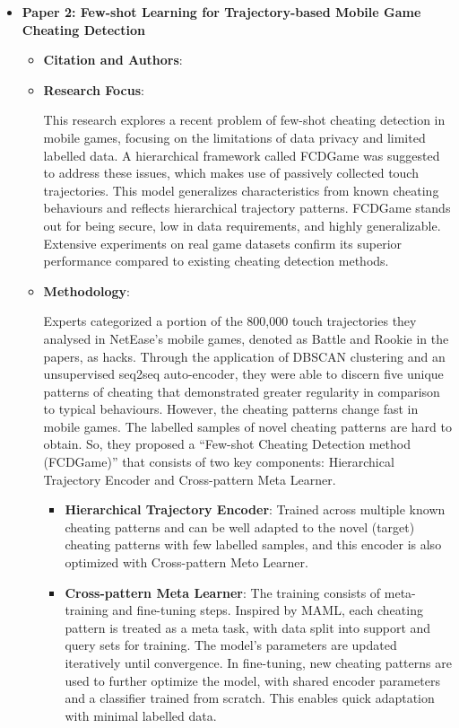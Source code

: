 \documentclass[a4paper, 12pt]{article}
\begin{document}
\begin{itemize}
\begin{itemize}
    \end{itemize}
    \item \textbf{Paper 2: Few-shot Learning for Trajectory-based Mobile Game Cheating Detection}
    \begin{itemize}
        \item \textbf{Citation and Authors}: \cite{su_2022_fewshot}
        \item \textbf{Research Focus}:

        This research explores a recent problem of few-shot cheating detection in mobile games, focusing on the limitations of data privacy and limited labelled data. A hierarchical framework called FCDGame was suggested to address these issues, which makes use of passively collected touch trajectories. This model generalizes characteristics from known cheating behaviours and reflects hierarchical trajectory patterns. FCDGame stands out for being secure, low in data requirements, and highly generalizable. Extensive experiments on real game datasets confirm its superior performance compared to existing cheating detection methods.
        
        \item \textbf{Methodology}:

        Experts categorized a portion of the 800,000 touch trajectories they analysed in NetEase's mobile games, denoted as Battle and Rookie in the papers, as hacks. Through the application of DBSCAN clustering and an unsupervised seq2seq auto-encoder, they were able to discern five unique patterns of cheating that demonstrated greater regularity in comparison to typical behaviours. However, the cheating patterns change fast in mobile games. The labelled samples of novel cheating patterns are hard to obtain. So, they proposed a “Few-shot Cheating Detection method (FCDGame)” that consists of two key components: Hierarchical Trajectory Encoder and Cross-pattern Meta Learner. 
        \begin{itemize}
            \item \textbf{Hierarchical Trajectory Encoder}: Trained across multiple known cheating patterns and can be well adapted to the novel (target) cheating patterns with few labelled samples, and this encoder is also optimized with Cross-pattern Meto Learner. 
            \item \textbf{Cross-pattern Meta Learner}: The training consists of meta-training and fine-tuning steps. Inspired by MAML, each cheating pattern is treated as a meta task, with data split into support and query sets for training. The model's parameters are updated iteratively until convergence. In fine-tuning, new cheating patterns are used to further optimize the model, with shared encoder parameters and a classifier trained from scratch. This enables quick adaptation with minimal labelled data.
        \end{itemize}


\end{itemize}
\end{itemize}
\end{document}
